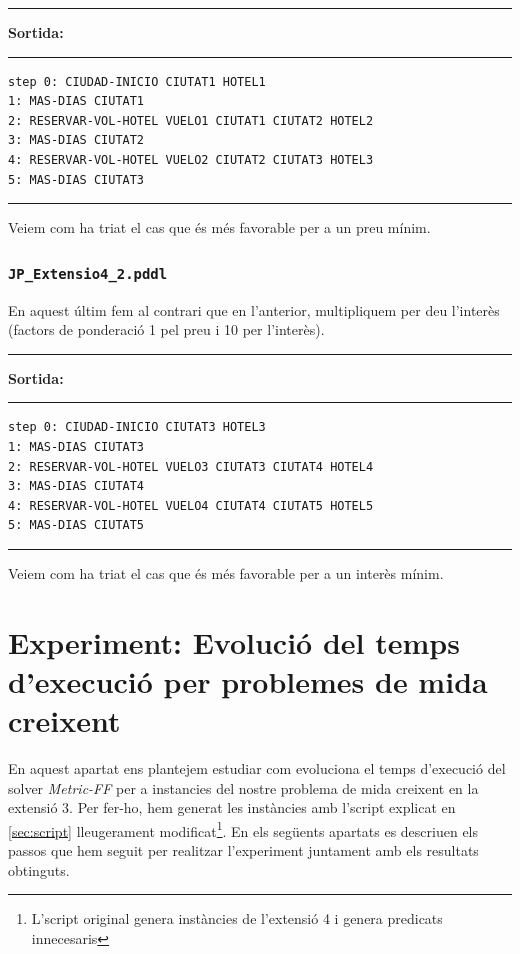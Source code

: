 \documentclass[11pt,a4paper]{article}
\begin{document}
\begin{samepage}
\medskip
\noindent
\rule{0.1\textwidth}{0.5mm}
\textbf{Sortida:}
\rule{0.76\textwidth}{0.5mm}
\begin{verbatim}
step 0: CIUDAD-INICIO CIUTAT1 HOTEL1
1: MAS-DIAS CIUTAT1
2: RESERVAR-VOL-HOTEL VUELO1 CIUTAT1 CIUTAT2 HOTEL2
3: MAS-DIAS CIUTAT2
4: RESERVAR-VOL-HOTEL VUELO2 CIUTAT2 CIUTAT3 HOTEL3
5: MAS-DIAS CIUTAT3
\end{verbatim}
\rule{\textwidth}{0.5mm}
\medskip
\end{samepage}

Veiem com ha triat el cas que és més favorable per a un preu mínim.

\subsubsection*{\texttt{JP\_Extensio4\_2.pddl}}

En aquest últim fem al contrari que en l'anterior, multipliquem per deu l'interès (factors de ponderació 1 pel preu i 10 per l'interès).

\begin{samepage}
\medskip
\noindent
\rule{0.1\textwidth}{0.5mm}
\textbf{Sortida:}
\rule{0.76\textwidth}{0.5mm}
\begin{verbatim}
step 0: CIUDAD-INICIO CIUTAT3 HOTEL3
1: MAS-DIAS CIUTAT3
2: RESERVAR-VOL-HOTEL VUELO3 CIUTAT3 CIUTAT4 HOTEL4
3: MAS-DIAS CIUTAT4
4: RESERVAR-VOL-HOTEL VUELO4 CIUTAT4 CIUTAT5 HOTEL5
5: MAS-DIAS CIUTAT5
\end{verbatim}
\rule{\textwidth}{0.5mm}
\medskip
\end{samepage}

Veiem com ha triat el cas que és més favorable per a un interès mínim.

\clearpage

\section[Experiment extra]{Experiment: Evolució del temps d'execució per problemes de mida creixent}
\label{sec:experiment}

En aquest apartat ens plantejem estudiar com evoluciona el temps d'execució del solver \emph{Metric-FF} per a instancies del nostre problema de mida creixent en la extensió 3. Per fer-ho, hem generat les instàncies amb l'script explicat en \ref{sec:script} lleugerament modificat\footnote{L'script original genera instàncies de l'extensió 4 i genera predicats innecesaris}. En els següents apartats es descriuen els passos que hem seguit per realitzar l'experiment juntament amb els resultats obtinguts.
\end{document}
